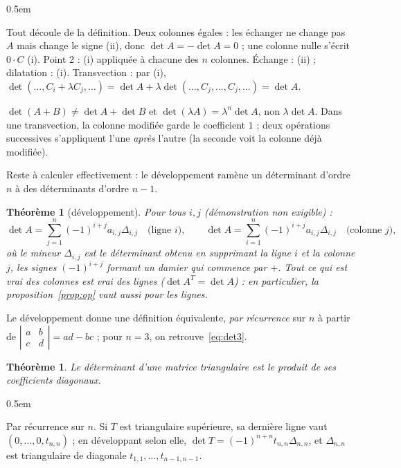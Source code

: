 \documentclass[a4paper,11pt]{article}
\makeatletter
\numberwithin{equation}{section}
\numberwithin{figure}{section}
\numberwithin{table}{section}
\theoremstyle{enonce}
\newtheorem{theoreme}[definition]{Théorème}
\theoremstyle{exemple}
\theoremstyle{remarque}
\renewcommand{\proofname}{Démonstration}
\renewenvironment{proof}[1][\proofname]{\par\pushQED{\qed}\normalfont
  \topsep0.5em\relax\trivlist\item[\hskip\labelsep\sffamily\itshape\color{Gris}#1.]\ignorespaces}
  {\popQED\endtrivlist\@endpefalse}
\newcommand{\dt}[1]{\left|\begin{matrix}#1\end{matrix}\right|}
\makeatother
\begin{document}
\begin{proof}
Tout découle de la définition. Deux colonnes égales : les échanger ne change pas $A$ mais change le signe (ii), donc
$\det A=-\det A=0$ ; une colonne nulle s'écrit $0\cdot C$ (i). Point 2 : (i) appliquée à chacune des $n$ colonnes. Échange :
(ii) ; dilatation : (i). Transvection : par (i), $\det(\dots,C_i+\lambda C_j,\dots)=\det A+\lambda\det(\dots,C_j,\dots,C_j,\dots)=\det A$.
\end{proof}

\begin{attention}
$\det(A+B)\neq\det A+\det B$ et $\det(\lambda A)=\lambda^n\det A$, non $\lambda\det A$. Dans une transvection, la colonne
modifiée garde le coefficient $1$ ; deux opérations successives s'appliquent l'une \emph{après} l'autre (la seconde voit la
colonne déjà modifiée).
\end{attention}

Reste à calculer effectivement : le développement ramène un déterminant d'ordre $n$ à des déterminants d'ordre $n-1$.

\begin{theoreme}[développement]\label{thm:dev}
Pour tous $i,j$ (démonstration non exigible) :
\[\det A=\sum_{j=1}^n(-1)^{i+j}a_{i,j}\Delta_{i,j}\quad\text{(ligne $i$)},\qquad
\det A=\sum_{i=1}^n(-1)^{i+j}a_{i,j}\Delta_{i,j}\quad\text{(colonne $j$)},\]
où le \emph{mineur} $\Delta_{i,j}$ est le déterminant obtenu en supprimant la ligne $i$ et la colonne $j$, les signes
$(-1)^{i+j}$ formant un damier qui commence par $+$. Tout ce qui est vrai des colonnes est vrai des lignes
($\det A^T=\det A$) : en particulier, la proposition~\ref{prop:op} vaut aussi pour les lignes.
\end{theoreme}

Le développement donne une définition équivalente, \emph{par récurrence} sur $n$ à partir de $\dt{a&b\\c&d}=ad-bc$ ; pour
$n=3$, on retrouve~\eqref{eq:det3}.

\begin{theoreme}\label{thm:tri}
Le déterminant d'une matrice triangulaire est le produit de ses coefficients diagonaux.
\end{theoreme}

\begin{proof}
Par récurrence sur $n$. Si $T$ est triangulaire supérieure, sa dernière ligne vaut $(0,\dots,0,t_{n,n})$ ; en développant
selon elle, $\det T=(-1)^{n+n}t_{n,n}\Delta_{n,n}$, et $\Delta_{n,n}$ est triangulaire de diagonale
$t_{1,1},\dots,t_{n-1,n-1}$.
\end{proof}
\end{document}
